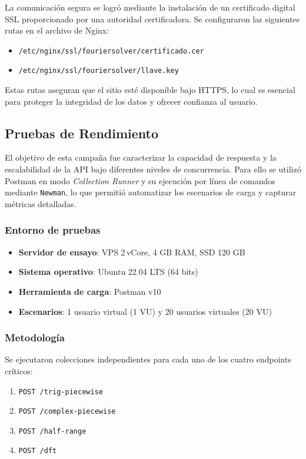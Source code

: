 La comunicación segura se logró mediante la instalación de un certificado digital SSL proporcionado por una autoridad certificadora. Se configuraron las siguientes rutas en el archivo de Nginx:

\begin{itemize}
	\item \texttt{/etc/nginx/ssl/fouriersolver/certificado.cer}
	\item \texttt{/etc/nginx/ssl/fouriersolver/llave.key}
\end{itemize}

Estas rutas aseguran que el sitio esté disponible bajo HTTPS, lo cual es esencial para proteger la integridad de los datos y ofrecer confianza al usuario.


\subsection{Pruebas de Rendimiento}
El objetivo de esta campaña fue caracterizar la capacidad de respuesta y la escalabilidad
de la API bajo diferentes niveles de concurrencia.  
Para ello se utilizó Postman en modo \textit{Collection Runner} y su ejecución por línea
de comandos mediante \texttt{Newman}, lo que permitió automatizar los escenarios de carga
y capturar métricas detalladas.

\subsubsection*{Entorno de pruebas}
\begin{itemize}
	\item \textbf{Servidor de ensayo}: VPS 2\,vCore, 4 GB RAM, SSD 120 GB
	\item \textbf{Sistema operativo}: Ubuntu 22.04 LTS (64 bits)
	\item \textbf{Herramienta de carga}: Postman v10 
	\item \textbf{Escenarios}: 1 usuario virtual (1 VU) y 20 usuarios virtuales (20 VU)
\end{itemize}

\subsubsection*{Metodología}
Se ejecutaron colecciones independientes para cada uno de los cuatro endpoints críticos:

\begin{enumerate}
	\item \texttt{POST /trig-piecewise}
	\item \texttt{POST /complex-piecewise}
	\item \texttt{POST /half-range}
	\item \texttt{POST /dft}
\end{enumerate}

